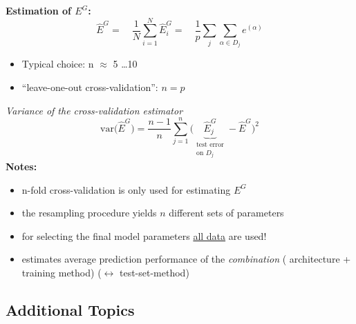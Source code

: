 \textbf{Estimation of $E^G$:}
\begin{equation}
	\widehat{E}^G = \quad\frac{1}{N} \sum_{i=1}^N \hat{E}_i^G= \quad\frac{1}{p} \sum_j \sum_{\alpha \in D_j} e^{(\alpha)}
\end{equation}
\begin{itemize}
\item Typical choice: n $\approx$ 5 \dots 10
\item ``leave-one-out cross-validation'': $n = p$ 
\end{itemize}
\emph{Variance of the cross-validation estimator}
\begin{equation}
	\mathrm{var} \Big( \widehat{E}^G \Big) = \frac{n-1}{n}
		\sum_{j = 1}^n \Big( \underbrace{\widehat{E}_j^G}_{
				\substack{\text{test error} \\
					\text{on } D_j}}
			- \widehat{E}^G \Big)^2
\end{equation}
\textbf{Notes:} 
\begin{itemize}
\item n-fold cross-validation is only used for estimating $E^G$
\item the resampling procedure yields $n$ different sets of parameters
\item for selecting the final model parameters \underline{all data} are used!
\item estimates average prediction performance of the \emph{combination} (
  architecture + training method) ($\leftrightarrow$ test-set-method)
\end{itemize}

\newpage					%
\subsection{Additional Topics}


